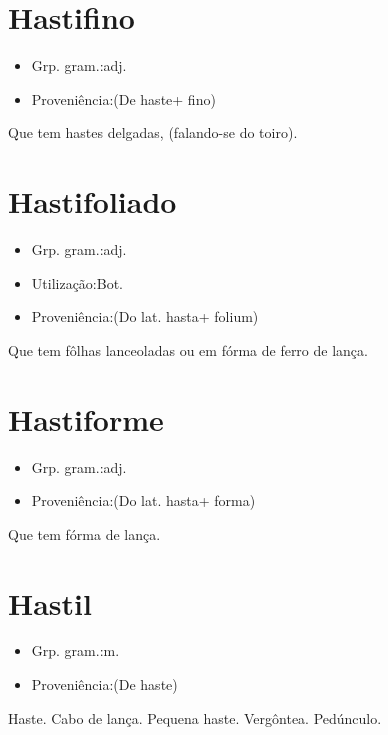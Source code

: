 \documentclass{article}
\begin{document}
\section{Hastifino}
\begin{itemize}
\item {Grp. gram.:adj.}
\end{itemize}
\begin{itemize}
\item {Proveniência:(De \textunderscore haste\textunderscore  + \textunderscore fino\textunderscore )}
\end{itemize}
Que tem hastes delgadas, (falando-se do toiro).
\section{Hastifoliado}
\begin{itemize}
\item {Grp. gram.:adj.}
\end{itemize}
\begin{itemize}
\item {Utilização:Bot.}
\end{itemize}
\begin{itemize}
\item {Proveniência:(Do lat. \textunderscore hasta\textunderscore  + \textunderscore folium\textunderscore )}
\end{itemize}
Que tem fôlhas lanceoladas ou em fórma de ferro de lança.
\section{Hastiforme}
\begin{itemize}
\item {Grp. gram.:adj.}
\end{itemize}
\begin{itemize}
\item {Proveniência:(Do lat. \textunderscore hasta\textunderscore  + \textunderscore forma\textunderscore )}
\end{itemize}
Que tem fórma de lança.
\section{Hastil}
\begin{itemize}
\item {Grp. gram.:m.}
\end{itemize}
\begin{itemize}
\item {Proveniência:(De \textunderscore haste\textunderscore )}
\end{itemize}
Haste.
Cabo de lança.
Pequena haste.
Vergôntea.
Pedúnculo.
\end{document}
